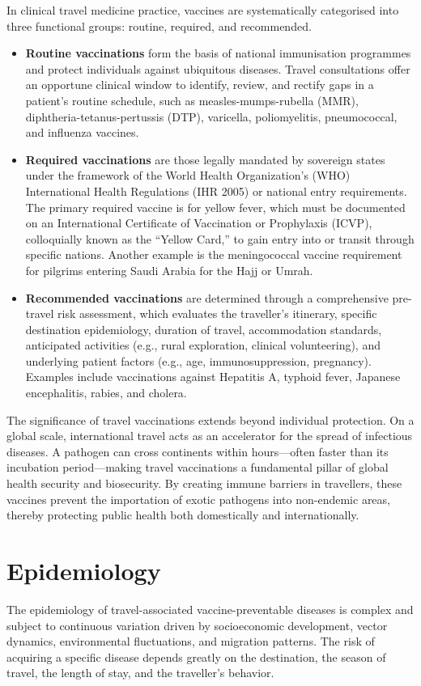 In clinical travel medicine practice, vaccines are systematically categorised into three functional groups: routine, required, and recommended.
\begin{itemize}
    \item \textbf{Routine vaccinations} form the basis of national immunisation programmes and protect individuals against ubiquitous diseases. Travel consultations offer an opportune clinical window to identify, review, and rectify gaps in a patient's routine schedule, such as measles-mumps-rubella (MMR), diphtheria-tetanus-pertussis (DTP), varicella, poliomyelitis, pneumococcal, and influenza vaccines.
    \item \textbf{Required vaccinations} are those legally mandated by sovereign states under the framework of the World Health Organization's (WHO) International Health Regulations (IHR 2005) or national entry requirements. The primary required vaccine is for yellow fever, which must be documented on an International Certificate of Vaccination or Prophylaxis (ICVP), colloquially known as the ``Yellow Card,'' to gain entry into or transit through specific nations. Another example is the meningococcal vaccine requirement for pilgrims entering Saudi Arabia for the Hajj or Umrah.
    \item \textbf{Recommended vaccinations} are determined through a comprehensive pre-travel risk assessment, which evaluates the traveller's itinerary, specific destination epidemiology, duration of travel, accommodation standards, anticipated activities (e.g., rural exploration, clinical volunteering), and underlying patient factors (e.g., age, immunosuppression, pregnancy). Examples include vaccinations against Hepatitis A, typhoid fever, Japanese encephalitis, rabies, and cholera.
\end{itemize}
The significance of travel vaccinations extends beyond individual protection. On a global scale, international travel acts as an accelerator for the spread of infectious diseases. A pathogen can cross continents within hours---often faster than its incubation period---making travel vaccinations a fundamental pillar of global health security and biosecurity. By creating immune barriers in travellers, these vaccines prevent the importation of exotic pathogens into non-endemic areas, thereby protecting public health both domestically and internationally.

\section*{Epidemiology}
The epidemiology of travel-associated vaccine-preventable diseases is complex and subject to continuous variation driven by socioeconomic development, vector dynamics, environmental fluctuations, and migration patterns. The risk of acquiring a specific disease depends greatly on the destination, the season of travel, the length of stay, and the traveller’s behavior.


